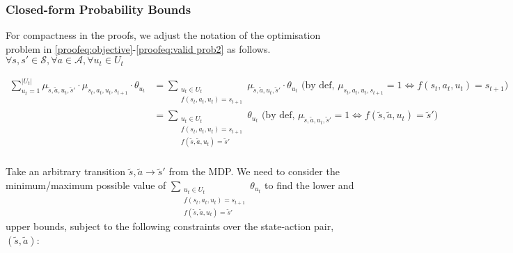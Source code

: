 

\pagebreak
\subsubsection{Closed-form Probability Bounds}
\label{sec: probability bounds cases}

For compactness in the proofs, we adjust the notation of the optimisation problem in \eqref{proofeq:objective}-\eqref{proofeq:valid prob2} as follows. $\forall s,s' \in \mathcal{S}, \forall a \in \mathcal{A}, \forall u_t \in U_t$

\begin{equation}
    \begin{aligned}
    \sum_{u_t = 1}^{|U_t|} \mu_{\tilde{s},\tilde{a}, u_t, \tilde{s}'} \cdot \mu_{s_t, a_t, u_t, s_{t+1}} \cdot \theta_{u_t}
    &= \sum_{\substack{u_t \in U_t\\f(s_t, a_t, u_t) = s_{t+1}}} \mu_{\tilde{s},\tilde{a}, u_t, \tilde{s}'} \cdot \theta_{u_t} \text{ (by def, $\mu_{s_t, a_t, u_t, s_{t+1}} = 1 \iff f(s_t, a_t, u_t) = s_{t+1}$)}\\
    &= \sum_{\substack{u_t \in U_t\\ f(s_t, a_t, u_t) = s_{t+1} \\ f(\tilde{s}, \tilde{a}, u_t) = \tilde{s}'}} \theta_{u_t} \text{ (by def, $\mu_{\tilde{s}, \tilde{a}, u_t, \tilde{s}'} = 1 \iff f(\tilde{s}, \tilde{a}, u_t) = \tilde{s}'$)}\\
\end{aligned}
\end{equation}

%

%

Take an arbitrary transition $\tilde{s}, \tilde{a} \rightarrow \tilde{s}'$ from the MDP. We need to consider the minimum/maximum possible value of 
$\sum_{\substack{u_t \in U_t\\f(s_t, a_t, u_t) = s_{t+1} \\ f(\tilde{s}, \tilde{a}, u_t) = \tilde{s}'}} \theta_{u_t}$ 
to find the lower and upper bounds, subject to the following constraints over the state-action pair, $(\tilde{s}, \tilde{a})$:

